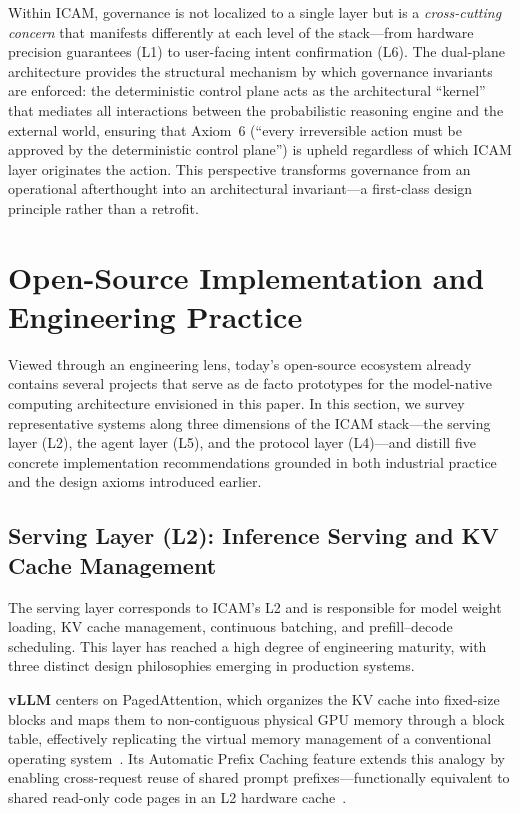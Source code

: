 \documentclass[11pt,a4paper]{article}
\newcounter{axiom}[section]
\begin{document}
Within ICAM, governance is not localized to a single layer but is a \emph{cross-cutting concern} that manifests differently at each level of the stack---from hardware precision guarantees (L1) to user-facing intent confirmation (L6).
The dual-plane architecture provides the structural mechanism by which governance invariants are enforced: the deterministic control plane acts as the architectural ``kernel'' that mediates all interactions between the probabilistic reasoning engine and the external world, ensuring that Axiom~6 (``every irreversible action must be approved by the deterministic control plane'') is upheld regardless of which ICAM layer originates the action.
This perspective transforms governance from an operational afterthought into an architectural invariant---a first-class design principle rather than a retrofit.




\section{Open-Source Implementation and Engineering Practice}
\label{sec:implementation}

Viewed through an engineering lens, today's open-source ecosystem already contains several projects that serve as de facto prototypes for the model-native computing architecture envisioned in this paper. In this section, we survey representative systems along three dimensions of the ICAM stack---the serving layer (L2), the agent layer (L5), and the protocol layer (L4)---and distill five concrete implementation recommendations grounded in both industrial practice and the design axioms introduced earlier.

\subsection{Serving Layer (L2): Inference Serving and KV Cache Management}
\label{sec:impl-serving}

The serving layer corresponds to ICAM's L2 and is responsible for model weight loading, KV cache management, continuous batching, and prefill--decode scheduling. This layer has reached a high degree of engineering maturity, with three distinct design philosophies emerging in production systems.

\textbf{vLLM} centers on PagedAttention, which organizes the KV cache into fixed-size blocks and maps them to non-contiguous physical GPU memory through a block table, effectively replicating the virtual memory management of a conventional operating system~\cite{kwon2023pagedattention,vllm_docs_2026}. Its Automatic Prefix Caching feature extends this analogy by enabling cross-request reuse of shared prompt prefixes---functionally equivalent to shared read-only code pages in an L2 hardware cache~\cite{vllm_prefix_2026}.
\end{document}
